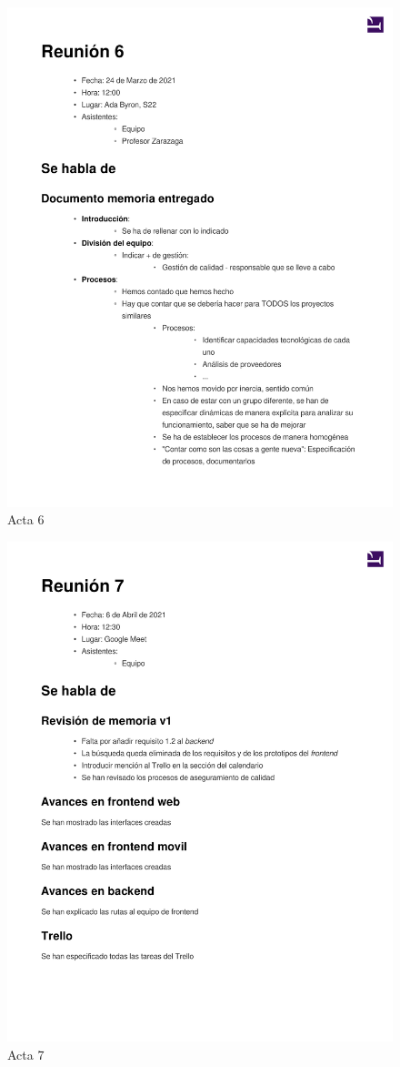 \documentclass{article}
\begin{document}
\begin{figure}
    \includegraphics[width=.8\textwidth]{../../actas_reuniones/acta6.pdf}
    \caption{Acta 6}
\end{figure}
\begin{figure}
    \includegraphics[width=.8\textwidth]{../../actas_reuniones/acta7.pdf}
    \caption{Acta 7}
\end{figure}
\end{document}
